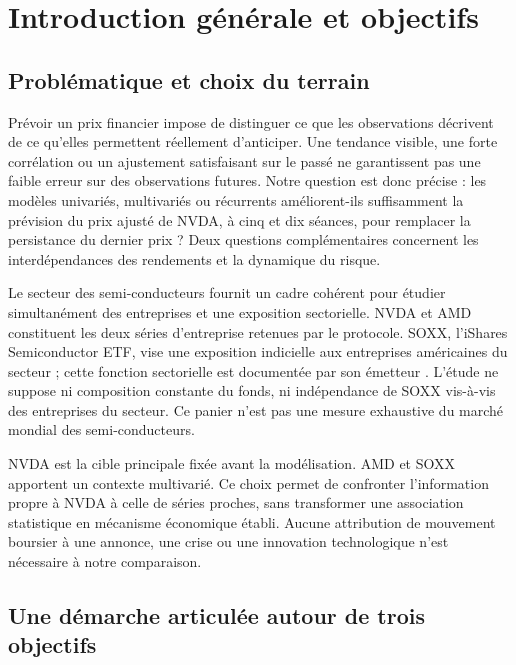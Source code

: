 \section{Introduction générale et objectifs}
\label{sec:introduction}

\subsection{Problématique et choix du terrain}



Prévoir un prix financier impose de distinguer ce que les observations décrivent de ce qu’elles permettent réellement d’anticiper. Une tendance visible, une forte corrélation ou un ajustement satisfaisant sur le passé ne garantissent pas une faible erreur sur des observations futures. Notre question est donc précise : les modèles univariés, multivariés ou récurrents améliorent-ils suffisamment la prévision du prix ajusté de NVDA, à cinq et dix séances, pour remplacer la persistance du dernier prix ? Deux questions complémentaires concernent les interdépendances des rendements et la dynamique du risque.



Le secteur des semi-conducteurs fournit un cadre cohérent pour étudier simultanément des entreprises et une exposition sectorielle. NVDA et AMD constituent les deux séries d’entreprise retenues par le protocole. SOXX, l’iShares Semiconductor ETF, vise une exposition indicielle aux entreprises américaines du secteur ; cette fonction sectorielle est documentée par son émetteur \cite{R1}. L’étude ne suppose ni composition constante du fonds, ni indépendance de SOXX vis-à-vis des entreprises du secteur. Ce panier n’est pas une mesure exhaustive du marché mondial des semi-conducteurs.



NVDA est la cible principale fixée avant la modélisation. AMD et SOXX apportent un contexte multivarié. Ce choix permet de confronter l’information propre à NVDA à celle de séries proches, sans transformer une association statistique en mécanisme économique établi. Aucune attribution de mouvement boursier à une annonce, une crise ou une innovation technologique n’est nécessaire à notre comparaison.



\subsection{Une démarche articulée autour de trois objectifs}



